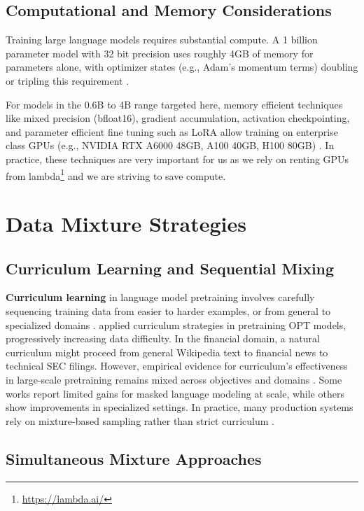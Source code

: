 \subsection{Computational and Memory Considerations}

Training large language models requires substantial compute. A 1 billion parameter model with 32 bit precision uses roughly 4GB of memory for parameters alone, with optimizer states (e.g., Adam's momentum terms) doubling or tripling this requirement \parencite{rajbhandari2020zero,kingma2014adam}. 

For models in the 0.6B to 4B range targeted here, memory efficient techniques like mixed precision (bfloat16), gradient accumulation, activation checkpointing, and parameter efficient fine tuning such as LoRA allow training on enterprise class GPUs (e.g., NVIDIA RTX A6000 48GB, A100 40GB, H100 80GB) \parencite{narayanan2021efficient,hu2021lora}. In practice, these techniques are very important for us as we rely on renting GPUs from lambda\footnote{\url{https://lambda.ai/}} and we are striving to save compute.

\section{Data Mixture Strategies}

\subsection{Curriculum Learning and Sequential Mixing}

\textbf{Curriculum learning} in language model pretraining involves carefully sequencing training data from easier to harder examples, or from general to specialized domains \parencite{bengio2009curriculum}. \textcite{wu2022opt} applied curriculum strategies in pretraining OPT models, progressively increasing data difficulty. In the financial domain, a natural curriculum might proceed from general Wikipedia text to financial news to technical SEC filings. However, empirical evidence for curriculum's effectiveness in large-scale pretraining remains mixed across objectives and domains \parencite{longpre2023pretrainer}. Some works report limited gains for masked language modeling at scale, while others show improvements in specialized settings. In practice, many production systems rely on mixture-based sampling rather than strict curriculum \parencite{raffel2020exploring,wu2022opt}.

\subsection{Simultaneous Mixture Approaches}

